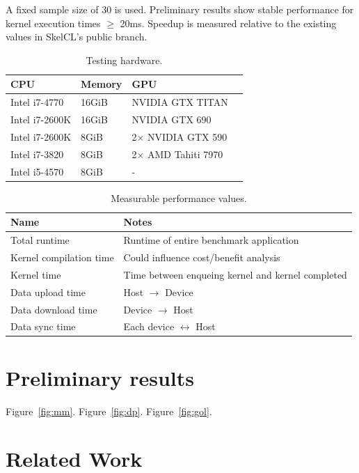 A fixed sample size of 30 is used.  Preliminary results show stable
performance for kernel execution times $\ge$ 20ms. Speedup is measured
relative to the existing values in SkelCL's public branch.

\begin{table}
\footnotesize
\centering
\begin{tabular}{| l | l | l | l |}
\hline
\textbf{CPU} & \textbf{Memory} & \textbf{GPU}\\
\hline
Intel i7-4770 & 16GiB & NVIDIA GTX TITAN\\
Intel i7-2600K & 16GiB & NVIDIA GTX 690\\
Intel i7-2600K & 8GiB & 2$\times$ NVIDIA GTX 590\\
Intel i7-3820 & 8GiB & 2$\times$ AMD Tahiti 7970\\
Intel i5-4570 & 8GiB & -\\
\hline
\end{tabular}
\caption{Testing hardware.}
\label{tab:hw}
\end{table}


\begin{table}
\footnotesize
\centering
\begin{tabular}{| l | l |}
\hline
\textbf{Name} & \textbf{Notes}\\
\hline
Total runtime & Runtime of entire benchmark application\\
Kernel compilation time & Could influence cost/benefit analysis\\
Kernel time & Time between enqueing kernel and kernel completed\\
Data upload time & Host $\rightarrow$ Device\\
Data download time & Device $\rightarrow$ Host\\
Data sync time & Each device $\leftrightarrow$ Host\\
\hline
\end{tabular}
\caption{Measurable performance values.}
\label{tab:metric}
\end{table}

\section{Preliminary results}

Figure~\ref{fig:mm}.
Figure~\ref{fig:dp}.
Figure~\ref{fig:gol}.

\section{Related Work}

